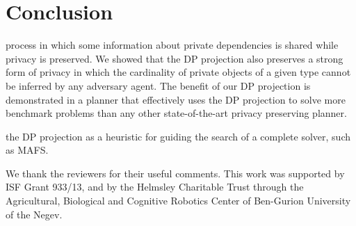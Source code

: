\documentclass[letterpaper]{article}
\theoremstyle{definition}
\begin{document}
\vspace{-1.74mm}
\vspace{-2.62mm}
\vspace{-3.49mm}
\section{Conclusion}
process in which some information about private dependencies is shared while privacy is preserved. We showed that the DP projection also preserves a strong form of privacy in which the cardinality of private objects of a given type cannot be inferred by any adversary agent. The benefit of our DP projection is demonstrated in a planner that effectively uses the DP projection to solve more benchmark problems than any other state-of-the-art privacy preserving planner.

the DP projection as a heuristic for guiding the search of a complete solver, such as MAFS.

 We thank the reviewers for their useful comments. This work was supported by ISF Grant 933/13, and by the Helmsley Charitable Trust through the Agricultural, Biological and Cognitive Robotics Center of Ben-Gurion University of the Negev.









\clearpage

\end{document}
